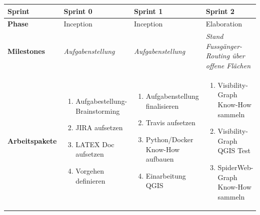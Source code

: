 \begin{landscape}
\begin{longtable}{l p{5.5cm} p{5.5cm} p{5.5cm}} 
        \toprule
        \textbf{Sprint}
                                & \textbf{Sprint 0}
                                & \textbf{Sprint 1}
                                & \textbf{Sprint 2} \\
        
        \midrule
        \textbf{Phase}
                                & Inception
                                & Inception
                                & Elaboration \\
        
        \textbf{Milestones} 	
                                & \textit{Aufgabenstellung}
                                & \textit{Aufgabenstellung}
                                & \textit{Stand Fussgänger-Routing über offene Flächen}  \\
        
        \textbf{Arbeitspakete}
                                & \begin{enumerate}[noitemsep]
                                    \item Aufgabestellung-Brainstorming
                                    \item JIRA aufsetzen
                                    \item LATEX Doc aufsetzen
                                    \item Vorgehen definieren
                                \end{enumerate}
                                & \begin{enumerate}[noitemsep]
                                    \item Aufgabenstellung finalisieren
                                    \item Travis aufsetzen
                                    \item Python/Docker Know-How aufbauen
                                    \item Einarbeitung QGIS
                                \end{enumerate}
                                & \begin{enumerate}[noitemsep]
                                    \item Visibility-Graph Know-How sammeln
                                    \item Visibility-Graph QGIS Test
                                    \item SpiderWeb-Graph Know-How sammeln
                                \end{enumerate}  \\
        

\end{longtable}
\end{landscape}
